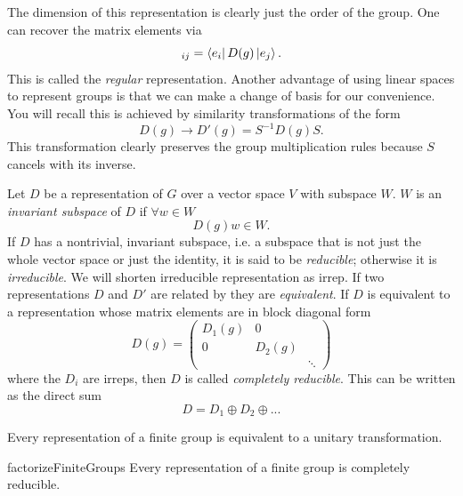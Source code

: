 The dimension of this representation is clearly just the order
of the group. One can recover the matrix elements via
\begin{equation}
  [D(g)]_{ij}=\bra{e_i}D(g)\ket{e_j}.
\end{equation}
  This is called the {\it regular} 
representation. Another advantage of using linear spaces to represent groups
is that we can make a change of basis for our convenience. You
will recall this is achieved by similarity transformations
of the form
\begin{equation}\label{eq:simtr}
  D(g)\to D'(g)=S^{-1}D(g)S.
\end{equation}
This transformation clearly preserves the group multiplication
rules because $S$ cancels with its inverse.

Let $D$ be a representation of $G$ over a vector space $V$ with
subspace $W$. $W$ is an {\it invariant subspace} 
of $D$ if
$\forall w\in W$
\begin{equation}
  D(g)w\in W.
\end{equation}
If $D$ has a nontrivial, invariant subspace, i.e.
a subspace that is not just the whole vector space or just
the identity, it is said to be {\it reducible};
 otherwise it is {\it irreducible}. 
We will shorten irreducible representation as irrep. If two representations $D$
and $D'$ are related by  they are {\it equivalent}.
If $D$ is equivalent to a representation whose matrix
elements are in block diagonal form
\begin{equation}\label{eq:reducible}
  D(g)=\left(\begin{array}{ccc}
             D_1(g) & 0      &       \\
             0      & D_2(g) &       \\
                    &        & \ddots
             \end{array}\right)
\end{equation}
where the $D_i$ are irreps, then $D$ is called {\it completely
reducible}. This can be written as the direct sum 
\begin{equation}
  D=D_1\oplus D_2\oplus ...
\end{equation}


\begin{theorem}{}{}
  Every representation of a finite group is equivalent to a
  unitary transformation.
\end{theorem}
\begin{theorem}{}{factorizeFiniteGroups}
  Every representation of a finite group is completely reducible.
\end{theorem}

